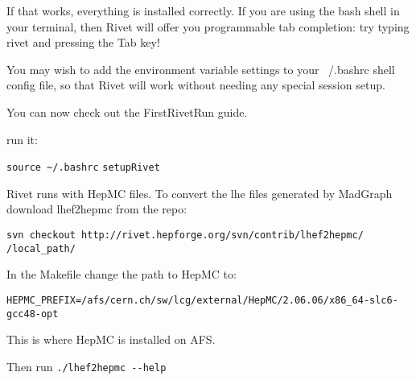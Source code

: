 If that works, everything is installed correctly. If you are using the bash shell in your terminal, then Rivet will offer you programmable tab completion: try typing rivet and pressing the Tab key!

You may wish to add the environment variable settings to your ~/.bashrc shell config file, so that Rivet will work without needing any special session setup.

You can now check out the FirstRivetRun guide.


run it: 

\lstinline|source ~/.bashrc|
\lstinline|setupRivet|

Rivet runs with HepMC files. To convert the lhe files generated by MadGraph download lhef2hepmc from the repo:

\lstinline|svn checkout http://rivet.hepforge.org/svn/contrib/lhef2hepmc/ /local_path/|

In the Makefile change the path to HepMC to:

\lstinline|HEPMC_PREFIX=/afs/cern.ch/sw/lcg/external/HepMC/2.06.06/x86_64-slc6-gcc48-opt|

This is where HepMC is installed on AFS.

Then run \lstinline|./lhef2hepmc --help|


